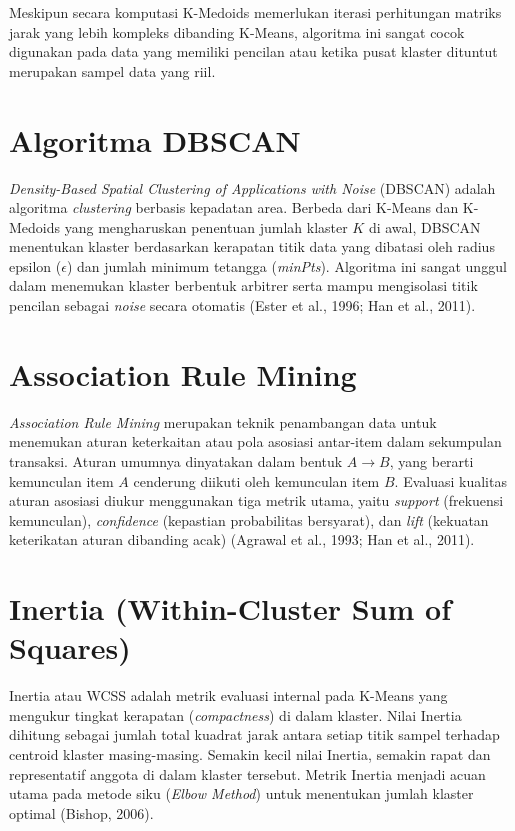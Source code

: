\documentclass[a4paper,oneside,12pt]{report}
\begin{document}
Meskipun secara komputasi K-Medoids memerlukan iterasi perhitungan matriks jarak yang lebih kompleks dibanding K-Means, algoritma ini sangat cocok digunakan pada data yang memiliki pencilan atau ketika pusat klaster dituntut merupakan sampel data yang riil.

\section{Algoritma DBSCAN}
\textit{Density-Based Spatial Clustering of Applications with Noise} (DBSCAN) adalah algoritma \textit{clustering} berbasis kepadatan area. Berbeda dari K-Means dan K-Medoids yang mengharuskan penentuan jumlah klaster $K$ di awal, DBSCAN menentukan klaster berdasarkan kerapatan titik data yang dibatasi oleh radius epsilon ($\epsilon$) dan jumlah minimum tetangga (\textit{minPts}). Algoritma ini sangat unggul dalam menemukan klaster berbentuk arbitrer serta mampu mengisolasi titik pencilan sebagai \textit{noise} secara otomatis (Ester et al., 1996; Han et al., 2011).

\section{Association Rule Mining}
\textit{Association Rule Mining} merupakan teknik penambangan data untuk menemukan aturan keterkaitan atau pola asosiasi antar-item dalam sekumpulan transaksi. Aturan umumnya dinyatakan dalam bentuk $A \rightarrow B$, yang berarti kemunculan item $A$ cenderung diikuti oleh kemunculan item $B$. Evaluasi kualitas aturan asosiasi diukur menggunakan tiga metrik utama, yaitu \textit{support} (frekuensi kemunculan), \textit{confidence} (kepastian probabilitas bersyarat), dan \textit{lift} (kekuatan keterikatan aturan dibanding acak) (Agrawal et al., 1993; Han et al., 2011).

\section{Inertia (Within-Cluster Sum of Squares)}
Inertia atau WCSS adalah metrik evaluasi internal pada K-Means yang mengukur tingkat kerapatan (\textit{compactness}) di dalam klaster. Nilai Inertia dihitung sebagai jumlah total kuadrat jarak antara setiap titik sampel terhadap centroid klaster masing-masing. Semakin kecil nilai Inertia, semakin rapat dan representatif anggota di dalam klaster tersebut. Metrik Inertia menjadi acuan utama pada metode siku (\textit{Elbow Method}) untuk menentukan jumlah klaster optimal (Bishop, 2006).
\end{document}
